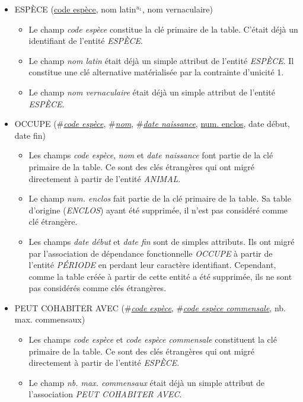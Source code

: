 \documentclass[a4paper]{article}
\newcommand{\relat}[1]{\textsc{#1}}
\newcommand{\attr}[1]{#1}
\newcommand{\prim}[1]{\uline{#1}}
\newcommand{\foreign}[1]{\#\textsl{#1}}
\begin{document}
\begin{itemize}
  \item \relat{ESPÈCE} (\prim{code espèce}, \attr{nom latin}$^{u_1}$, \attr{nom vernaculaire})
  \begin{itemize}
    \item Le champ \emph{code espèce} constitue la clé primaire de la table. C'était déjà un identifiant de l'entité \emph{ESPÈCE}.
    \item Le champ \emph{nom latin} était déjà un simple attribut de l'entité \emph{ESPÈCE}. Il constitue une clé alternative matérialisée par la contrainte d'unicité 1.
    \item Le champ \emph{nom vernaculaire} était déjà un simple attribut de l'entité \emph{ESPÈCE}.
  \end{itemize}

  \item \relat{OCCUPE} (\foreign{\prim{code espèce}}, \foreign{\prim{nom}}, \foreign{\prim{date naissance}}, \prim{num. enclos}, \attr{date début}, \attr{date fin})
  \begin{itemize}
    \item Les champs \emph{code espèce}, \emph{nom} et \emph{date naissance} font partie de la clé primaire de la table. Ce sont des clés étrangères qui ont migré directement à partir de l'entité \emph{ANIMAL}.
    \item Le champ \emph{num. enclos} fait partie de la clé primaire de la table. Sa table d'origine (\emph{ENCLOS}) ayant été supprimée, il n'est pas considéré comme clé étrangère.
    \item Les champs \emph{date début} et \emph{date fin} sont de simples attributs. Ils ont migré par l'association de dépendance fonctionnelle \emph{OCCUPE} à partir de l'entité \emph{PÉRIODE} en perdant leur caractère identifiant. Cependant, comme la table créée à partir de cette entité a été supprimée, ils ne sont pas considérés comme clés étrangères.
  \end{itemize}

  \item \relat{PEUT COHABITER AVEC} (\foreign{\prim{code espèce}}, \foreign{\prim{code espèce commensale}}, \attr{nb. max. commensaux})
  \begin{itemize}
    \item Les champs \emph{code espèce} et \emph{code espèce commensale} constituent la clé primaire de la table. Ce sont des clés étrangères qui ont migré directement à partir de l'entité \emph{ESPÈCE}.
    \item Le champ \emph{nb. max. commensaux} était déjà un simple attribut de l'association \emph{PEUT COHABITER AVEC}.
  \end{itemize}


\end{itemize}
\end{document}
